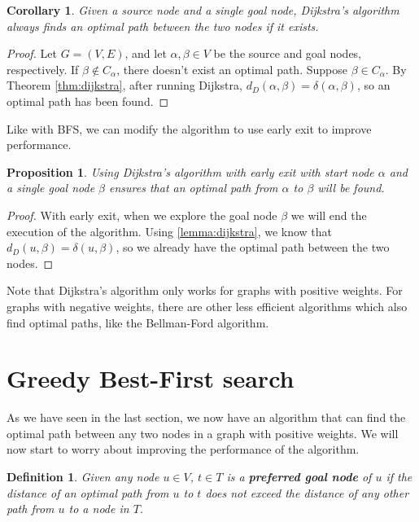 \documentclass[12pt]{report}
\newtheorem{definition}[theorem]{Definition}
\newtheorem{proposition}[theorem]{Proposition}
\newtheorem{corollary}[theorem]{Corollary}
\begin{document}
\begin{corollary}
Given a source node and a single goal node, Dijkstra's algorithm always finds an optimal path between the two nodes if it exists.
\end{corollary}
\begin{proof}
Let $G = (V, E)$, and let $\alpha, \beta \in V$ be the source and goal nodes, respectively. If $\beta \not \in C_\alpha$, there doesn't exist an optimal path. Suppose $\beta \in C_\alpha$. By Theorem \ref{thm:dijkstra}, after running Dijkstra, $d_D(\alpha, \beta) = \delta(\alpha, \beta)$, so an optimal path has been found.
\end{proof}

Like with BFS, we can modify the algorithm to use early exit to improve performance.
\begin{proposition}
Using Dijkstra's algorithm with early exit with start node $\alpha$ and a single goal node $\beta$ ensures that an optimal path from $\alpha$ to $\beta$ will be found.
\end{proposition}
\begin{proof}
With early exit, when we explore the goal node $\beta$ we will end the execution of the algorithm. Using \ref{lemma:dijkstra}, we know that $d_D(u, \beta) = \delta(u, \beta)$, so we already have the optimal path between the two nodes.
\end{proof}

Note that Dijkstra's algorithm only works for graphs with positive weights. For graphs with negative weights, there are other less efficient algorithms which also find optimal paths, like the Bellman-Ford algorithm.

\section{Greedy Best-First search}
\label{section:greedy}
As we have seen in the last section, we now have an algorithm that can find the optimal path between any two nodes in a graph with positive weights. We will now start to worry about improving the performance of the algorithm.

\begin{definition}
Given any node $u \in V$, $t \in T$ is a \textbf{preferred goal node} of $u$ if the distance of an optimal path from $u$ to $t$ does not exceed the distance of any other path from $u$ to a node in $T$.
\end{definition}
\end{document}
